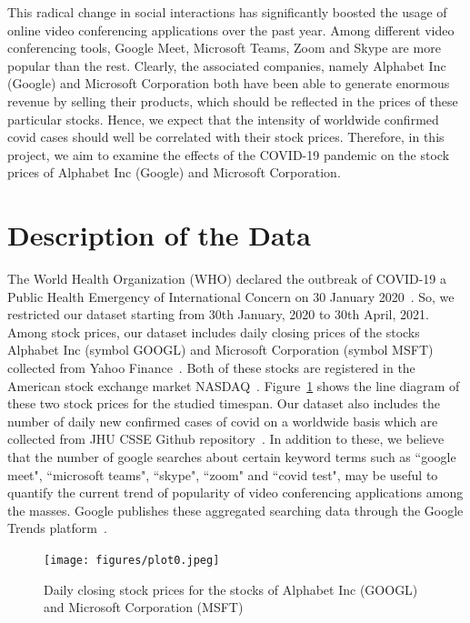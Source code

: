\documentclass[11pt, a4paper]{article}
\begin{document}
This radical change in social interactions has significantly boosted the usage of online video conferencing applications over the past year. Among different video conferencing tools, Google Meet, Microsoft Teams, Zoom and Skype are more popular than the rest. Clearly, the associated companies, namely Alphabet Inc (Google) and Microsoft Corporation both have been able to generate enormous revenue by selling their products, which should be reflected in the prices of these particular stocks. Hence, we expect that the intensity of worldwide confirmed covid cases should well be correlated with their stock prices. Therefore, in this project, we aim to examine the effects of the COVID-19 pandemic on the stock prices of Alphabet Inc (Google) and Microsoft Corporation. 

\section{Description of the Data}

The World Health Organization (WHO) declared the outbreak of COVID-19 a Public Health Emergency of International Concern on 30 January 2020~\cite{wiki-covid-syndrome}. So, we restricted our dataset starting from 30th January, 2020 to 30th April, 2021. Among stock prices, our dataset includes daily closing prices of the stocks Alphabet Inc (symbol GOOGL) and Microsoft Corporation (symbol MSFT) collected from Yahoo Finance~\cite{yahoo-finance}. Both of these stocks are registered in the American stock exchange market NASDAQ~\cite{nasdaq}. Figure~\ref{fig:stock-price} shows the line diagram of these two stock prices for the studied timespan. Our dataset also includes the number of daily new confirmed cases of covid on a worldwide basis which are collected from JHU CSSE Github repository~\cite{coviddata}. In addition to these, we believe that the number of google searches about certain keyword terms such as ``google meet", ``microsoft teams", ``skype", ``zoom" and ``covid test", may be useful to quantify the current trend of popularity of video conferencing applications among the masses. Google publishes these aggregated searching data through the Google Trends platform~\cite{google-trends}. 

\begin{figure}
    \centering
    \texttt{[image: figures/plot0.jpeg]}
    \caption{Daily closing stock prices for the stocks of Alphabet Inc (GOOGL) and Microsoft Corporation (MSFT)}
    \label{fig:stock-price}
\end{figure}
\end{document}
